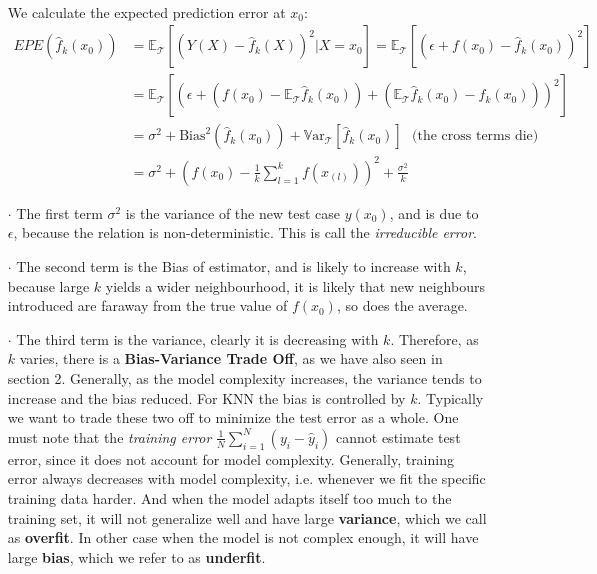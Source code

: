 \documentclass[a4paper, 11pt]{article}
\begin{document}
\begin{itemize}
	~\\
	We calculate the expected prediction error at $x_0$:
	\begin{equation}
		\begin{split}
			EPE(\hat{f}_k(x_0)) &= \mathbb{E}_{\mathcal{T}}\left[(Y(X)-\hat{f}_k(X))^2|X=x_0\right] = \mathbb{E}_{\mathcal{T}}\left[(\epsilon + f(x_0)-\hat{f}_k(x_0))^2\right]\\
			&= \mathbb{E}_{\mathcal{T}}\left[\left(\epsilon + (f(x_0) -\mathbb{E}_{\mathcal{T}}\hat{f}_k(x_0))+(\mathbb{E}_{\mathcal{T}}\hat{f}_k(x_0)-\hat{f}_k(x_0))\right)^2\right]\\
			&= \sigma^2 + \text{Bias}^2(\hat{f}_k(x_0)) + \mathrm{\mathbb{V}ar}_{\mathcal{T}}\left[\hat{f}_{k}(x_0)\right]~~~\text{(the cross terms die)}\\
			&= \sigma^2  + \left(f(x_0)-\frac{1}{k}\sum_{l=1}^k f(x_{(l)})\right)^2 + \frac{\sigma^2}{k}
		\end{split}
	\end{equation}
	\item[$\cdot$] The first term $\sigma^2$ is the variance of the new test case $y(x_0)$, and is due to $\epsilon$, because the relation is non-deterministic. This is call the \textit{irreducible error}.
	\item[$\cdot$] The second term is the Bias of estimator, and is likely to increase with $k$, because large $k$ yields a wider neighbourhood, it is likely that new neighbours introduced are faraway from the true value of $f(x_0)$, so does the average.
	\item[$\cdot$] The third term is the variance, clearly it is decreasing with $k$.
	Therefore, as $k$ varies, there is a \textbf{Bias-Variance Trade Off}, as we have also seen in section 2. Generally, as the model complexity increases, the variance tends to increase and the bias reduced. For KNN the bias is controlled by $k$. Typically we want to trade these two off to minimize the test error as a whole. One must note that the \emph{training error} $\frac{1}{N}\sum_{i=1}^N (y_i-\hat{y}_i)$ cannot estimate test error, since it does not account for model complexity. Generally, training error always decreases with model complexity, i.e. whenever we fit the specific training data harder. And when the model adapts itself too much to the training set, it will not generalize well and have large \textbf{variance}, which we call as \textbf{overfit}. In other case when the model is not complex enough, it will have large \textbf{bias}, which we refer to as \textbf{underfit}.
\end{itemize}
\end{document}
